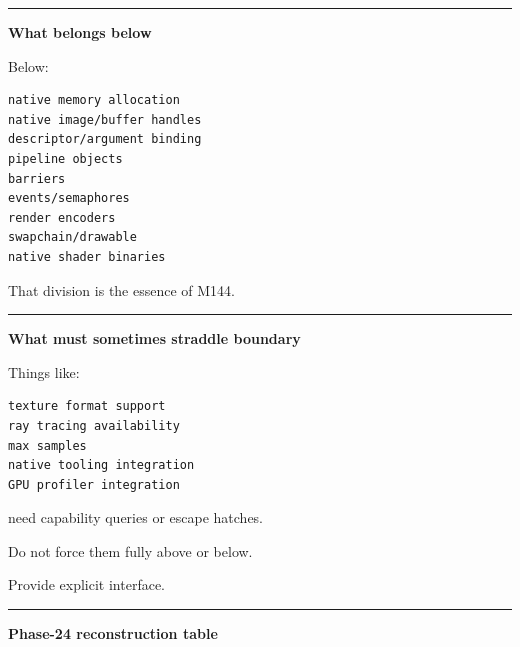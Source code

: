\begin{center}\rule{0.5\linewidth}{0.5pt}\end{center}

\textbf{What belongs below}

Below:

\begin{verbatim}
native memory allocation
native image/buffer handles
descriptor/argument binding
pipeline objects
barriers
events/semaphores
render encoders
swapchain/drawable
native shader binaries
\end{verbatim}

That division is the essence of M144.

\begin{center}\rule{0.5\linewidth}{0.5pt}\end{center}

\textbf{What must sometimes straddle boundary}

Things like:

\begin{verbatim}
texture format support
ray tracing availability
max samples
native tooling integration
GPU profiler integration
\end{verbatim}

need capability queries or escape hatches.

Do not force them fully above or below.

Provide explicit interface.

\begin{center}\rule{0.5\linewidth}{0.5pt}\end{center}

\textbf{Phase-24 reconstruction table}

